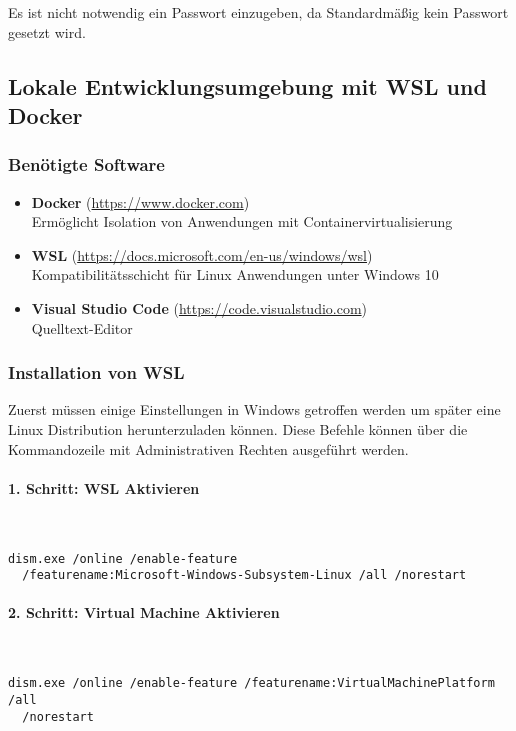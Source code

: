Es ist nicht notwendig ein Passwort einzugeben, da Standardmäßig kein Passwort
gesetzt wird.

\subsection{Lokale Entwicklungsumgebung mit WSL und Docker}

\subsubsection{Benötigte Software}

\begin{itemize}
  \item \textbf{Docker} (\url{https://www.docker.com}) \\ Ermöglicht Isolation
  von Anwendungen mit Containervirtualisierung
  \item \textbf{WSL} (\url{https://docs.microsoft.com/en-us/windows/wsl}) \\
  Kompatibilitätsschicht für Linux Anwendungen unter Windows 10
  \item \textbf{Visual Studio Code} (\url{https://code.visualstudio.com}) \\
  Quelltext-Editor
\end{itemize}

\subsubsection{Installation von WSL}
Zuerst müssen einige Einstellungen in Windows getroffen werden um später eine
Linux Distribution herunterzuladen können. Diese Befehle können über die
Kommandozeile mit Administrativen Rechten ausgeführt werden.

\paragraph{1. Schritt: WSL Aktivieren}\mbox{}\\
\begin{lstlisting}[caption={WSL Feature Feature aktivierens}, captionpos=b]
  dism.exe /online /enable-feature
  /featurename:Microsoft-Windows-Subsystem-Linux /all /norestart
\end{lstlisting}

\paragraph{2. Schritt: Virtual Machine Aktivieren}\mbox{}\\
\begin{lstlisting}[caption={Virtual Machine Feature aktivieren}, captionpos=b]
  dism.exe /online /enable-feature /featurename:VirtualMachinePlatform /all
  /norestart
\end{lstlisting}

